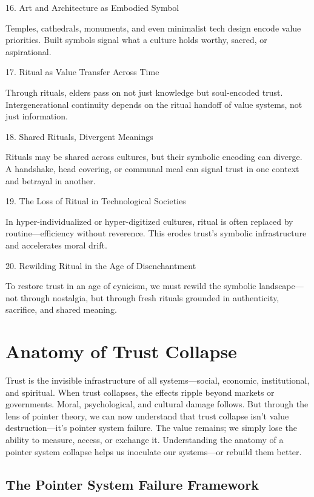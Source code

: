 \documentclass[11pt,oneside]{book}
\begin{document}
16. Art and Architecture as Embodied Symbol


Temples, cathedrals, monuments, and even minimalist tech design encode value priorities. Built symbols signal what a culture holds worthy, sacred, or aspirational.

17. Ritual as Value Transfer Across Time


Through rituals, elders pass on not just knowledge but soul-encoded trust. Intergenerational continuity depends on the ritual handoff of value systems, not just information.

18. Shared Rituals, Divergent Meanings


Rituals may be shared across cultures, but their symbolic encoding can diverge. A handshake, head covering, or communal meal can signal trust in one context and betrayal in another.

19. The Loss of Ritual in Technological Societies


In hyper-individualized or hyper-digitized cultures, ritual is often replaced by routine—efficiency without reverence. This erodes trust’s symbolic infrastructure and accelerates moral drift.

20. Rewilding Ritual in the Age of Disenchantment


To restore trust in an age of cynicism, we must rewild the symbolic landscape—not through nostalgia, but through fresh rituals grounded in authenticity, sacrifice, and shared meaning.


\chapter{Anatomy of Trust Collapse}

Trust is the invisible infrastructure of all systems—social, economic, institutional, and spiritual. When trust collapses, the effects ripple beyond markets or governments. Moral, psychological, and cultural damage follows. But through the lens of pointer theory, we can now understand that trust collapse isn't value destruction—it's pointer system failure. The value remains; we simply lose the ability to measure, access, or exchange it. Understanding the anatomy of a pointer system collapse helps us inoculate our systems—or rebuild them better.

\section{The Pointer System Failure Framework}
\end{document}
